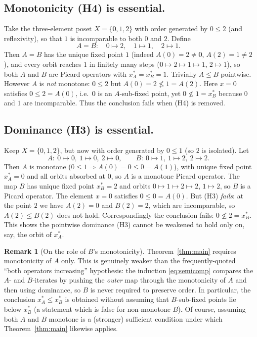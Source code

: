 \documentclass{amsart}
\theoremstyle{plain}
\theoremstyle{definition}
\newtheorem{remark}{Remark}
\newcommand{\xA}{x^{*}_{A}}
\newcommand{\xB}{x^{*}_{B}}
\begin{document}
\subsection*{Monotonicity (H4) is essential.}
Take the three-element poset $X=\{0,1,2\}$ with order generated by $0\le 2$
(and reflexivity), so that $1$ is incomparable to both $0$ and $2$. Define
\[
   A=B:\quad 0\mapsto 2,\quad 1\mapsto 1,\quad 2\mapsto 1 .
\]
Then $A=B$ has the unique fixed point $1$ (indeed $A(0)=2\ne0$, $A(2)=1\ne2$),
and every orbit reaches $1$ in finitely many steps
($0\mapsto2\mapsto1\mapsto1$, $2\mapsto1$), so both $A$ and $B$ are Picard
operators with $\xA=\xB=1$. Trivially $A\le B$ pointwise. However $A$ is
\emph{not} monotone: $0\le 2$ but $A(0)=2\not\le 1=A(2)$. Here $x=0$ satisfies
$0\le 2=A(0)$, i.e.\ $0$ is an $A$-sub-fixed point, yet $0\not\le 1=\xB$ because
$0$ and $1$ are incomparable. Thus the conclusion fails when (H4) is removed.

\subsection*{Dominance (H3) is essential.}
Keep $X=\{0,1,2\}$, but now with order generated by $0\le 1$ (so $2$ is
isolated). Let
\[
   A:\ 0\mapsto0,\ 1\mapsto0,\ 2\mapsto0,\qquad
   B:\ 0\mapsto1,\ 1\mapsto2,\ 2\mapsto2 .
\]
Then $A$ is monotone ($0\le1\Rightarrow A(0)=0\le0=A(1)$), with unique fixed
point $\xA=0$ and all orbits absorbed at $0$, so $A$ is a monotone Picard
operator. The map $B$ has unique fixed point $\xB=2$ and orbits
$0\mapsto1\mapsto2\mapsto2$, $1\mapsto2$, so $B$ is a Picard operator. The
element $x=0$ satisfies $0\le0=A(0)$. But (H3) \emph{fails}: at the point $2$
we have $A(2)=0$ and $B(2)=2$, which are incomparable, so $A(2)\le B(2)$ does
not hold. Correspondingly the conclusion fails: $0\not\le 2=\xB$. This shows the
pointwise dominance (H3) cannot be weakened to hold only on, say, the orbit of
$\xA$.

\begin{remark}[On the role of $B$'s monotonicity]
Theorem~\ref{thm:main} requires monotonicity of $A$ only. This is genuinely
weaker than the frequently-quoted ``both operators increasing'' hypothesis: the
induction \eqref{eq:semicomp} compares the $A$- and $B$-iterates by pushing the
\emph{outer} map through the monotonicity of $A$ and then using dominance, so
$B$ is never required to preserve order. In particular, the conclusion
$\xA\le\xB$ is obtained without assuming that $B$-sub-fixed points lie below
$\xB$ (a statement which is false for non-monotone $B$). Of course, assuming
both $A$ and $B$ monotone is a (stronger) sufficient condition under which
Theorem~\ref{thm:main} likewise applies.
\end{remark}
\end{document}
